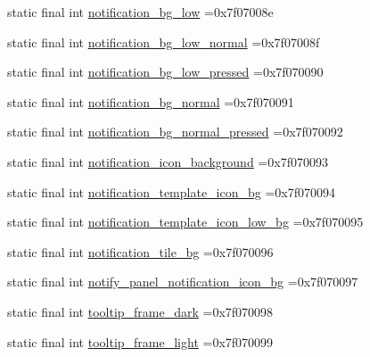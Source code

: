\begin{DoxyCompactItemize}
\item 
static final int \mbox{\hyperlink{classbr_1_1unb_1_1cic_1_1mp_1_1marketmaster_1_1test_1_1R_1_1drawable_afb388c62f1f01194e440e07006676751}{notification\+\_\+bg\+\_\+low}} =0x7f07008e
\item 
static final int \mbox{\hyperlink{classbr_1_1unb_1_1cic_1_1mp_1_1marketmaster_1_1test_1_1R_1_1drawable_ae1f84f7e85270f4f824d9d019063cdda}{notification\+\_\+bg\+\_\+low\+\_\+normal}} =0x7f07008f
\item 
static final int \mbox{\hyperlink{classbr_1_1unb_1_1cic_1_1mp_1_1marketmaster_1_1test_1_1R_1_1drawable_a2363811571d22a9ed65d0fa28dffb138}{notification\+\_\+bg\+\_\+low\+\_\+pressed}} =0x7f070090
\item 
static final int \mbox{\hyperlink{classbr_1_1unb_1_1cic_1_1mp_1_1marketmaster_1_1test_1_1R_1_1drawable_a740d0055a0ba26f6acad57be439beef9}{notification\+\_\+bg\+\_\+normal}} =0x7f070091
\item 
static final int \mbox{\hyperlink{classbr_1_1unb_1_1cic_1_1mp_1_1marketmaster_1_1test_1_1R_1_1drawable_a7266cb09628af6d6698713adbf4407e4}{notification\+\_\+bg\+\_\+normal\+\_\+pressed}} =0x7f070092
\item 
static final int \mbox{\hyperlink{classbr_1_1unb_1_1cic_1_1mp_1_1marketmaster_1_1test_1_1R_1_1drawable_a21f2dd31a5ca1542a64b802fac770af1}{notification\+\_\+icon\+\_\+background}} =0x7f070093
\item 
static final int \mbox{\hyperlink{classbr_1_1unb_1_1cic_1_1mp_1_1marketmaster_1_1test_1_1R_1_1drawable_aa62452043e0d14f313fa0724c6ec5acb}{notification\+\_\+template\+\_\+icon\+\_\+bg}} =0x7f070094
\item 
static final int \mbox{\hyperlink{classbr_1_1unb_1_1cic_1_1mp_1_1marketmaster_1_1test_1_1R_1_1drawable_a5587ae1ef502d68f9e980faf7e8d4254}{notification\+\_\+template\+\_\+icon\+\_\+low\+\_\+bg}} =0x7f070095
\item 
static final int \mbox{\hyperlink{classbr_1_1unb_1_1cic_1_1mp_1_1marketmaster_1_1test_1_1R_1_1drawable_a2778b747e23ac4458386e67f25c2af76}{notification\+\_\+tile\+\_\+bg}} =0x7f070096
\item 
static final int \mbox{\hyperlink{classbr_1_1unb_1_1cic_1_1mp_1_1marketmaster_1_1test_1_1R_1_1drawable_ae0cf3f94ff75ee2fdc4a74d5ced7b9cd}{notify\+\_\+panel\+\_\+notification\+\_\+icon\+\_\+bg}} =0x7f070097
\item 
static final int \mbox{\hyperlink{classbr_1_1unb_1_1cic_1_1mp_1_1marketmaster_1_1test_1_1R_1_1drawable_a849be6d4bf08879fe8ec7ad350e1a3e1}{tooltip\+\_\+frame\+\_\+dark}} =0x7f070098
\item 
static final int \mbox{\hyperlink{classbr_1_1unb_1_1cic_1_1mp_1_1marketmaster_1_1test_1_1R_1_1drawable_a25225572e5a65a441540b65ed06f2864}{tooltip\+\_\+frame\+\_\+light}} =0x7f070099
\end{DoxyCompactItemize}


